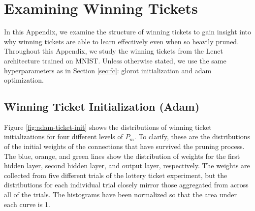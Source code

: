 \section{Examining Winning Tickets}
\label{app:examining}

In this Appendix, we examine the structure of winning tickets to gain insight into why winning tickets are able
to learn effectively even when so heavily pruned.
Throughout this Appendix, we study the winning tickets from the Lenet architecture trained on MNIST. Unless otherwise stated, we use the same hyperparameters
as in Section \ref{sec:fc}: glorot initialization and adam optimization.

\subsection{Winning Ticket Initialization (Adam)}

Figure \ref{fig:adam-ticket-init} shows the distributions of winning ticket initializations for four different levels of $P_m$.
To clarify, these are the distributions of the initial weights of the connections that have survived the pruning process.
The blue, orange, and green lines show the distribution of weights for the first hidden layer, second hidden layer, and output
layer, respectively. The weights are collected from five different trials of the lottery ticket experiment, but the distributions
for each individual trial closely mirror those aggregated from across all of the trials. The histograms have been normalized so that
the area under each curve is 1.

